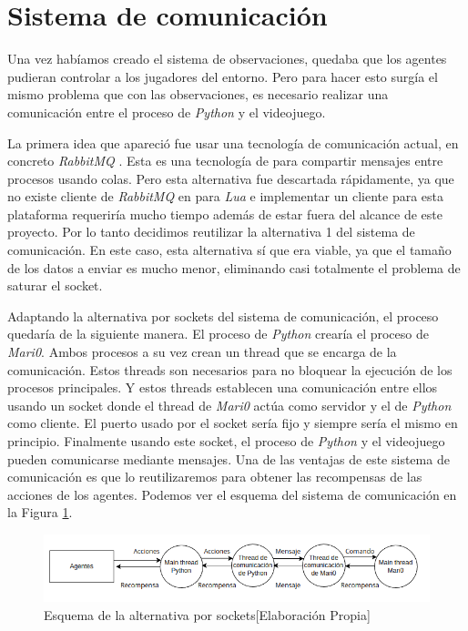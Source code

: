 \section{Sistema de comunicación}

Una vez habíamos creado el sistema de observaciones, quedaba que los agentes pudieran controlar a los jugadores del entorno. Pero para hacer esto surgía el mismo problema que con las observaciones, es necesario realizar una comunicación entre el proceso de \textit{Python} y el videojuego.

La primera idea que apareció fue usar una tecnología de comunicación actual, en concreto \textit{RabbitMQ} \cite {RabbitMQ}. Esta es una tecnología de para compartir mensajes entre procesos usando colas. Pero esta alternativa fue descartada rápidamente, ya que no existe cliente de \textit{RabbitMQ} en para \textit{Lua} e implementar un cliente para esta plataforma requeriría mucho tiempo además de estar fuera del alcance de este proyecto. Por lo tanto decidimos reutilizar la alternativa 1 del sistema de comunicación. En este caso, esta alternativa sí que era viable, ya que el tamaño de los datos a enviar es mucho menor, eliminando casi totalmente el problema de saturar el socket.

Adaptando la alternativa por sockets del sistema de comunicación, el proceso quedaría de la siguiente manera. El proceso de \textit{Python} crearía el proceso de \textit{Mari0}. Ambos procesos a su vez crean un thread que se encarga de la comunicación. Estos threads son necesarios para no bloquear la ejecución de los procesos principales. Y estos threads establecen una comunicación entre ellos usando un socket donde el thread de \textit{Mari0} actúa como servidor y el de \textit{Python} como cliente. El puerto usado por el socket sería fijo y siempre sería el mismo en principio. Finalmente usando este socket, el proceso de \textit{Python} y el videojuego pueden comunicarse mediante mensajes. Una de las ventajas de este sistema de comunicación es que lo reutilizaremos para obtener las recompensas de las acciones de los agentes. Podemos ver el esquema del sistema de comunicación en la Figura \ref {fig:alternativa-1-acc}. 
\begin{figure}[ht]
    \centering
    \includegraphics[width=1.0\textwidth]{img/comunication.png}
    \caption{Esquema de la alternativa por sockets[Elaboración Propia]}
    \label{fig:alternativa-1-acc}
\end{figure}

